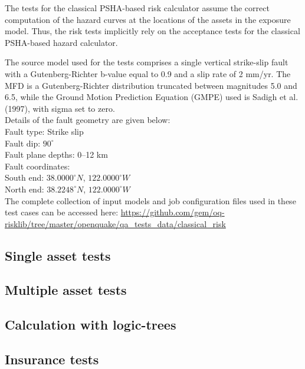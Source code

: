The tests for the classical PSHA-based risk calculator assume the correct computation of the hazard curves at the locations of the assets in the exposure model. Thus, the risk tests implicitly rely on the acceptance tests for the classical PSHA-based hazard calculator.

The source model used for the tests comprises a single vertical strike-slip fault with a Gutenberg-Richter b-value equal to 0.9 and a slip rate of 2 mm/yr. The MFD is a Gutenberg-Richter distribution truncated between magnitudes 5.0 and 6.5, while the Ground Motion Prediction Equation (GMPE) used is Sadigh et al. (1997), with sigma set to zero.\\

\noindent Details of the fault geometry are given below:\\

\noindent
Fault type: Strike slip\\
Fault dip: $90^{\circ}$\\
Fault plane depths: 0--12 km\\
Fault coordinates:\\
South end: $38.0000^{\circ} N$, $122.0000^{\circ} W$\\
North end: $38.2248^{\circ} N$, $122.0000^{\circ} W$\\

The complete collection of input models and job configuration files used in these test cases can be accessed here:
\href{https://github.com/gem/oq-risklib/tree/master/openquake/qa_tests_data/classical_risk}
{https://github.com/gem/oq-risklib/tree/master/openquake/qa\_tests\_data/classical\_risk}

\subsection{Single asset tests}
\label{subsec:acc-cr-single}


\subsection{Multiple asset tests}
\label{subsec:acc-cr-multiple}


\subsection{Calculation with logic-trees}
\label{subsec:acc-cr-logictrees}


\subsection{Insurance tests}
\label{subsec:acc-cr-insurance}

